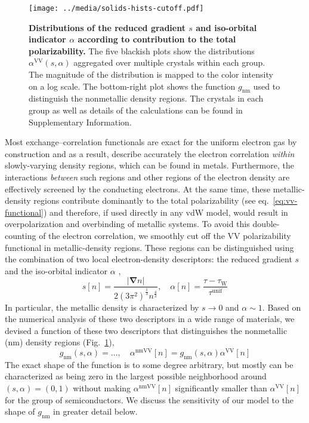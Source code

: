 \begin{figure}[t!]
\centering
\texttt{[image: ../media/solids-hists-cutoff.pdf]}
\caption{\textbf{Distributions of the reduced gradient $s$ and iso-orbital indicator $\alpha$ according to contribution to the total polarizability.}
The five blackish plots show the distributions $\alpha^\text{VV}(s,\alpha)$ aggregated over multiple crystals within each group.
The magnitude of the distribution is mapped to the color intensity on a log scale.
The bottom-right plot shows the function $g_\text{nm}$ used to distinguish the nonmetallic density regions.
The crystals in each group as well as details of the calculations can be found in Supplementary Information.
}\label{fig:solids-hists-cutoff}
\end{figure}

Most exchange--correlation functionals are exact for the uniform electron gas by construction and as a result, describe accurately the electron correlation \emph{within} slowly-varying density regions, which can be found in metals.
Furthermore, the interactions \emph{between} such regions and other regions of the electron density are effectively screened by the conducting electrons.
At the same time, these metallic-density regions contribute dominantly to the total polarizability (see eq.~\ref{eq:vv-functional}) and therefore, if used directly in any vdW model, would result in overpolarization and overbinding of metallic systems.
To avoid this double-counting of the electron correlation, we smoothly cut off the VV polarizability functional in metallic-density regions.
These regions can be distinguished using the combination of two local electron-density descriptors: the reduced gradient $s$ and the iso-orbital indicator $\alpha$ \citep{BeckeJCP90,KummelMP03,SunPRL13},
\begin{equation}
  s[n]=\frac{|\boldsymbol\nabla n|}{2(3\pi^2)^\frac13n^\frac43},\quad
  \alpha[n]=\frac{\tau-\tau_\text{W}}{\tau^\text{unif}}
\end{equation}
In particular, the metallic density is characterized by $s\rightarrow0$ and $\alpha\sim1$.
Based on the numerical analysis of these two descriptors in a wide range of materials, we devised a function of these two descriptors that distinguishes the nonmetallic (nm) density regions (Fig.~\ref{fig:solids-hists-cutoff}),
\begin{equation}
  g_\text{nm}(s,\alpha)=\ldots,\quad
  \alpha^\text{nmVV}[n]=g_\text{nm}(s,\alpha)\alpha^\text{VV}[n]
\end{equation}
The exact shape of the function is to some degree arbitrary, but mostly can be characterized as being zero in the largest possible neighborhood around $(s,\alpha)=(0,1)$ without making $\alpha^\text{nmVV}[n]$ significantly smaller than $\alpha^\text{VV}[n]$ for the group of semiconductors.
We discuss the sensitivity of our model to the shape of $g_\text{nm}$ in greater detail below.

